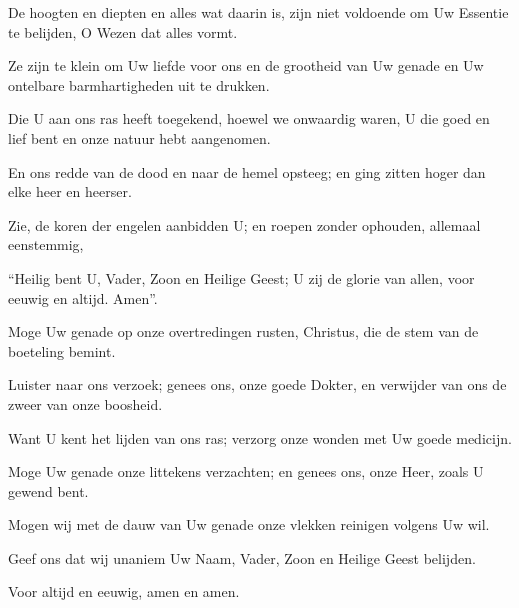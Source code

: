 \documentclass[12pt,twoside,a5paper]{article}
\begin{document}
\begin{halfparskip}

  De hoogten en diepten en alles wat daarin is, zijn niet voldoende om Uw Essentie te belijden, O Wezen dat alles vormt.

  Ze zijn te klein om Uw liefde voor ons en de grootheid van Uw genade en Uw ontelbare barmhartigheden uit te drukken.

  Die U aan ons ras heeft toegekend, hoewel we onwaardig waren, U die goed en lief bent en onze natuur hebt aangenomen.

  En ons redde van de dood en naar de hemel opsteeg; en ging zitten hoger dan elke heer en heerser.

  Zie, de koren der engelen aanbidden U; en roepen zonder ophouden, allemaal eenstemmig,

  ``Heilig bent U, Vader, Zoon en Heilige Geest; U zij de glorie van allen, voor eeuwig en altijd. Amen''.
\end{halfparskip}

\begin{halfparskip}

  Moge Uw genade op onze overtredingen rusten, Christus, die de stem van de boeteling bemint.

  Luister naar ons verzoek; genees ons, onze goede Dokter, en verwijder van ons de zweer van onze boosheid.

  Want U kent het lijden van ons ras; verzorg onze wonden met Uw goede medicijn.

  Moge Uw genade onze littekens verzachten; en genees ons, onze Heer, zoals U gewend bent.

  Mogen wij met de dauw van Uw genade onze vlekken reinigen volgens Uw wil.

  Geef ons dat wij unaniem Uw Naam, Vader, Zoon en Heilige Geest belijden.

  Voor altijd en eeuwig, amen en amen.
\end{halfparskip}
\end{document}

